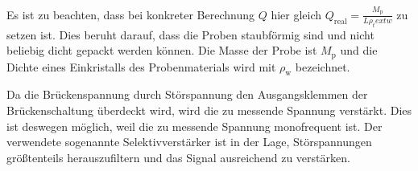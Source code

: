 Es ist zu beachten, dass bei konkreter Berechnung $Q$ hier gleich $Q_\text{real} =  \frac{M_\text{p}}{L \rho_text{w}}$
zu setzen ist. Dies beruht darauf, dass die Proben staubförmig sind und nicht beliebig
dicht gepackt werden können. Die Masse der Probe ist $M_\text{p}$ und die Dichte eines Einkristalls
des Probenmaterials wird mit $\rho_\text{w}$ bezeichnet.

Da die Brückenspannung durch Störspannung den Ausgangsklemmen der Brückenschaltung
überdeckt wird, wird die zu messende Spannung verstärkt. Dies ist deswegen möglich, weil
die zu messende Spannung monofrequent ist. Der verwendete sogenannte Selektivverstärker
ist in der Lage, Störspannungen größtenteils herauszufiltern und das Signal ausreichend zu verstärken.
